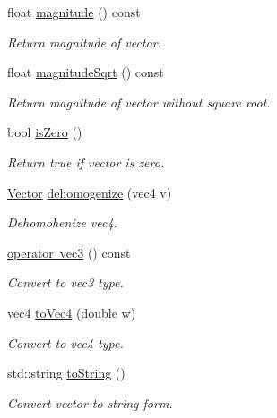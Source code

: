 \begin{DoxyCompactItemize}
\mbox{\label{struct_vector_ace8c138209e35e339b8da86e511cc090}} 
float \mbox{\hyperlink{struct_vector_ace8c138209e35e339b8da86e511cc090}{magnitude}} () const
\begin{DoxyCompactList}\small\item\em Return magnitude of vector. \end{DoxyCompactList}\item 
\mbox{\label{struct_vector_a3c97a1b944cd23e15859865a6c322cee}} 
float \mbox{\hyperlink{struct_vector_a3c97a1b944cd23e15859865a6c322cee}{magnitude\+Sqrt}} () const
\begin{DoxyCompactList}\small\item\em Return magnitude of vector without square root. \end{DoxyCompactList}\item 
\mbox{\label{struct_vector_ae279192766f976662d5cef1b2a2ddbca}} 
bool \mbox{\hyperlink{struct_vector_ae279192766f976662d5cef1b2a2ddbca}{is\+Zero}} ()
\begin{DoxyCompactList}\small\item\em Return true if vector is zero. \end{DoxyCompactList}\item 
\mbox{\label{struct_vector_abae17376df67dea199493dcea7842627}} 
\mbox{\hyperlink{struct_vector}{Vector}} \mbox{\hyperlink{struct_vector_abae17376df67dea199493dcea7842627}{dehomogenize}} (vec4 v)
\begin{DoxyCompactList}\small\item\em Dehomohenize vec4. \end{DoxyCompactList}\item 
\mbox{\label{struct_vector_a1144ae14028f8ebc82319ccb35e64c73}} 
\mbox{\hyperlink{struct_vector_a1144ae14028f8ebc82319ccb35e64c73}{operator vec3}} () const
\begin{DoxyCompactList}\small\item\em Convert to vec3 type. \end{DoxyCompactList}\item 
\mbox{\label{struct_vector_a12a38eaac9443aa88be4d809f7503bbb}} 
vec4 \mbox{\hyperlink{struct_vector_a12a38eaac9443aa88be4d809f7503bbb}{to\+Vec4}} (double w)
\begin{DoxyCompactList}\small\item\em Convert to vec4 type. \end{DoxyCompactList}\item 
\mbox{\label{struct_vector_a64c59aad18d8a3f95ac3b6500f92bdd3}} 
std\+::string \mbox{\hyperlink{struct_vector_a64c59aad18d8a3f95ac3b6500f92bdd3}{to\+String}} ()
\begin{DoxyCompactList}\small\item\em Convert vector to string form. \end{DoxyCompactList}\end{DoxyCompactItemize}

